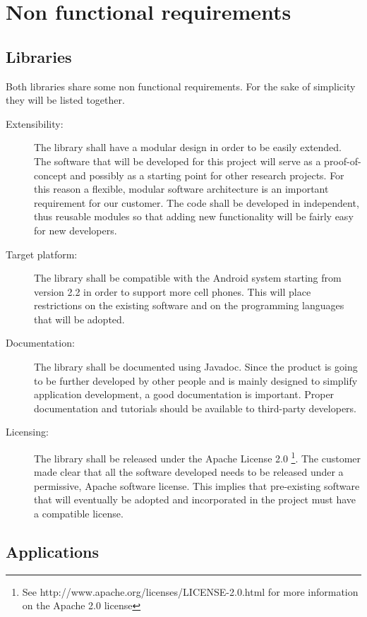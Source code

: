 \newpage

\section{Non functional requirements}

\subsection{Libraries}

Both libraries share some non functional requirements.
For the sake of simplicity they will be listed together.

\begin{description}
	\item[Extensibility:] The library shall have a modular design
	in order to be easily extended. The software that will be developed for
	this project will serve as a proof-of-concept and possibly as a starting
	point for other research projects. For this reason a flexible, modular
	software architecture is an important requirement for our customer. The code
	shall be developed in independent, thus reusable modules so that adding new
	functionality will be fairly easy for new developers.
	\item[Target platform:] The library shall be compatible with the Android
	system starting from version 2.2 in order to support more cell phones. This will place restrictions on the
	existing software and on the programming languages that will be adopted.
	\item[Documentation:] The library shall be documented using Javadoc.
	Since the product is going to be further developed by other people and is
	mainly designed to simplify application development, a good documentation is
	important. Proper documentation and tutorials should be available to
	third-party developers.
	\item[Licensing:] The library shall be released under the Apache License 2.0
	\footnote{See http://www.apache.org/licenses/LICENSE-2.0.html for more
	information on the Apache 2.0 license}. The customer made clear that all the
	software developed needs to be released under a permissive, Apache software
	license. This implies that pre-existing software that will eventually be
	adopted and incorporated in the project must have a compatible license.
\end{description}

\subsection{Applications}


